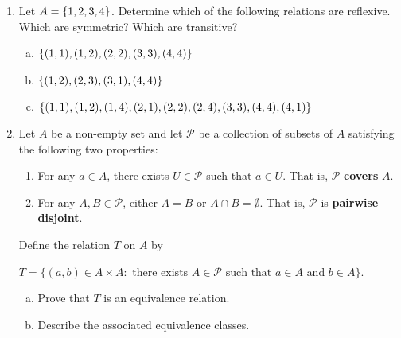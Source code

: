 \documentclass[11pt,fleqn,dvipsnames,usenames]{article}
\begin{document}
\begin{enumerate}
\item Let $A = \left\{1,2,3,4\right\}$.  Determine which of the following relations are reflexive.  Which are symmetric?  Which are transitive?
\begin{enumerate}[(a)]
\item $\left\{(1,1), (1,2), (2,2), (3,3), (4,4)\right\}$
\item $\left\{(1,2), (2,3), (3,1), (4,4)\right\}$
\item $\left\{(1,1), (1,2), (1,4), (2,1), (2,2), (2,4), (3,3), (4,4), (4,1)\right\}$
\end{enumerate}
\item Let $A$ be a non-empty set and let $\mathcal{P}$ be a collection of subsets of $A$ satisfying the following two properties:
\begin{enumerate}[(1)]
\item For any $a\in A$, there exists $U\in\mathcal{P}$ such that $a\in U$.  That is, $\mathcal{P}$ \textbf{covers} $A$.
\item For any $A,B\in\mathcal{P}$, either $A = B$ or $A\cap B = \emptyset$.  That is, $\mathcal{P}$ is \textbf{pairwise disjoint}.
\end{enumerate}
Define the relation $T$ on $A$ by
\begin{center}
$T = \big\{(a,b)\in A\times A:\text{ there exists }A\in\mathcal{P}\text{ such that }a\in A\text{ and }b\in A\big\}$.
\end{center}
\begin{enumerate}[(a)]
\item Prove that $T$ is an equivalence relation.
\item Describe the associated equivalence classes.
\end{enumerate}
\end{enumerate}
\end{document}
